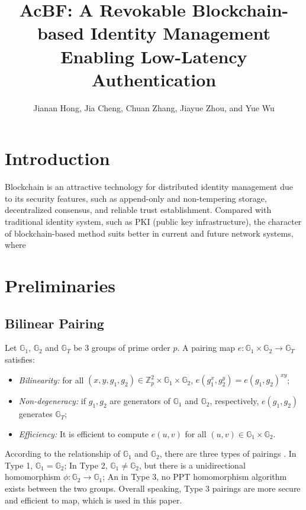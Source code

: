 \documentclass[conference]{IEEEtran}
\title{AcBF: A Revokable Blockchain-based Identity Management Enabling Low-Latency Authentication}
\author{Jianan Hong, Jia Cheng, Chuan Zhang, Jiayue Zhou, and Yue Wu}
\begin{document}
\maketitle

\section{Introduction}
Blockchain is an attractive technology for distributed identity management due to its security features, such as append-only and non-tempering storage, decentralized consensus, and reliable trust establishment. Compared with traditional identity system, such as PKI (public key infrastructure), the character of blockchain-based method suits better in current and future network systems, where

\section{Preliminaries}

\subsection{Bilinear Pairing}
Let $\mathbb{G}_1$, $\mathbb{G}_2$ and $\mathbb{G}_T$ be 3 groups of prime order $p$. A pairing map $e:\mathbb{G}_1\times \mathbb{G}_2\rightarrow\mathbb{G}_T$ satisfies:
\begin{itemize}
	\item \textit{Bilinearity:} for all $(x,y, g_1, g_2) \in \mathbb{Z}_p^2\times \mathbb{G}_1\times \mathbb{G}_2$, $e(g_1^x, g_2^y) = e(g_1, g_2)^{xy}$;
	\item \textit{Non-degeneracy:} if $g_1, g_2$ are generators of $\mathbb{G}_1$ and $\mathbb{G}_2$, respectively, $e(g_1, g_2)$ generates $\mathbb{G}_T$;
	\item \textit{Efficiency:} It is efficient to compute $e(u,v)$ for all $(u, v) \in \mathbb{G}_1\times \mathbb{G}_2$.
\end{itemize}

According to the relationship of $\mathbb{G}_1$ and $\mathbb{G}_2$, there are three types of pairings \cite{GALBRAITH20083113}. 
In Type 1, $\mathbb{G}_1 = \mathbb{G}_2$; In Type 2, $\mathbb{G}_1 \neq \mathbb{G}_2$, but there is a unidirectional homomorphism $\phi:\mathbb{G}_2 \rightarrow \mathbb{G}_1$; An in Type 3, no PPT homomorphism algorithm exists between the two groups.
Overall speaking, Type 3 pairings are more secure and efficient to map, which is used in this paper.
\end{document}
